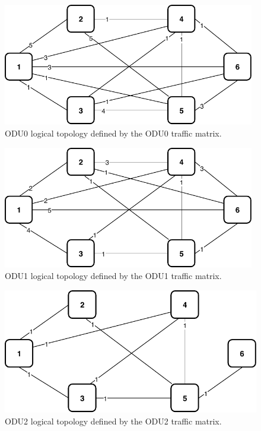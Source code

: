\begin{figure}[h!]
\centering
\includegraphics[width=11cm]{sdf/ilp/transparent_protection/figures/logical_topology_ODU0_low}
\caption{ODU0 logical topology defined by the ODU0 traffic matrix.}
\label{logical2_ODU0_protectionlow}
\end{figure}

\begin{figure}[h!]
\centering
\includegraphics[width=11cm]{sdf/ilp/transparent_protection/figures/logical_topology_ODU1_low}
\caption{ODU1 logical topology defined by the ODU1 traffic matrix.}
\label{logical2_ODU1_protectionlow}
\end{figure}
\newpage
\begin{figure}[h!]
\centering
\includegraphics[width=12cm]{sdf/ilp/transparent_protection/figures/logical_topology_ODU2_low}
\caption{ODU2 logical topology defined by the ODU2 traffic matrix.}
\label{logical2_ODU2_protectionlow}
\end{figure}

